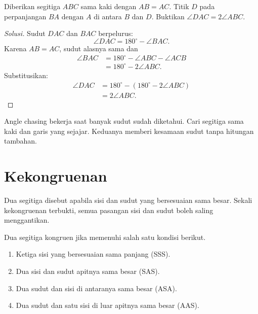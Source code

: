 \documentclass[12pt]{scrartcl}
\begin{document}
\begin{example}
Diberikan segitiga $ABC$ sama kaki dengan $AB = AC$. Titik $D$ pada
perpanjangan $BA$ dengan $A$ di antara $B$ dan $D$. Buktikan
$\angle DAC = 2\angle ABC$.
\begin{center}
\end{center}
\end{example}
\begin{proof}[Solusi]
Sudut $DAC$ dan $BAC$ berpelurus:
\[ \angle DAC = 180^\circ - \angle BAC. \]
Karena $AB = AC$, sudut alasnya sama dan
\begin{align*}
\angle BAC &= 180^\circ - \angle ABC - \angle ACB \\
&= 180^\circ - 2\angle ABC.
\end{align*}
Substitusikan:
\begin{align*}
\angle DAC &= 180^\circ - (180^\circ - 2\angle ABC) \\
&= 2\angle ABC.
\end{align*}
\end{proof}

\begin{remark}
Angle chasing bekerja saat banyak sudut sudah diketahui. Cari segitiga
sama kaki dan garis yang sejajar. Keduanya memberi kesamaan sudut tanpa
hitungan tambahan.
\end{remark}

\section{Kekongruenan}

Dua segitiga disebut  apabila sisi dan sudut
yang bersesuaian sama besar. Sekali kekongruenan terbukti, semua pasangan
sisi dan sudut boleh saling menggantikan.

\begin{fact}
Dua segitiga kongruen jika memenuhi salah satu kondisi berikut.
\begin{enumerate}
    \item Ketiga sisi yang bersesuaian sama panjang (SSS).
    \item Dua sisi dan sudut apitnya sama besar (SAS).
    \item Dua sudut dan sisi di antaranya sama besar (ASA).
    \item Dua sudut dan satu sisi di luar apitnya sama besar (AAS).
\end{enumerate}
\end{fact}
\end{document}
